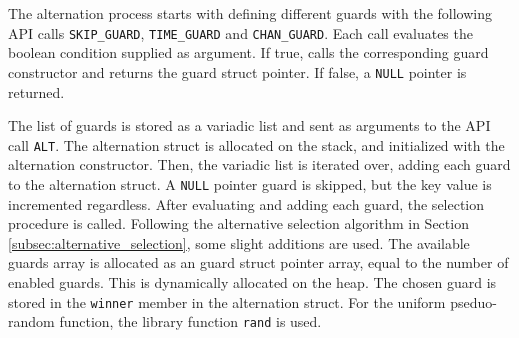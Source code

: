 The alternation process starts with defining different guards with the following API calls \texttt{SKIP\_GUARD}, \texttt{TIME\_GUARD} and \texttt{CHAN\_GUARD}. Each call evaluates the boolean condition supplied as argument. If true, calls the corresponding guard constructor and returns the guard struct pointer. If false, a \texttt{NULL} pointer is returned. 

The list of guards is stored as a variadic list and sent as arguments to the API call \texttt{ALT}. The alternation struct is allocated on the stack, and initialized with the alternation constructor. Then, the variadic list is iterated over, adding each guard to the alternation struct. A \texttt{NULL} pointer guard is skipped, but the key value is incremented regardless. After evaluating and adding each guard, the selection procedure is called. Following the alternative selection algorithm in Section \ref{subsec:alternative_selection}, some slight additions are used. The available guards array is allocated as an guard struct pointer array, equal to the number of enabled guards. This is dynamically allocated on the heap. The chosen guard is stored in the \texttt{winner} member in the alternation struct. For the uniform pseduo\hyp{}random function, the library function \texttt{rand} is used.

